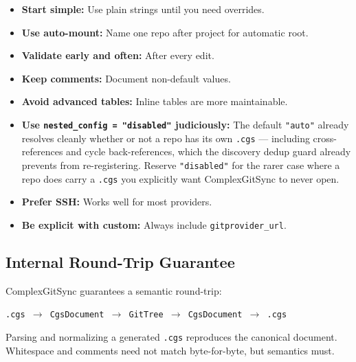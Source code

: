 \begin{itemize}
  \item \textbf{Start simple:} Use plain strings until you need overrides.
  \item \textbf{Use auto-mount:} Name one repo after project for automatic root.
  \item \textbf{Validate early and often:} After every edit.
  \item \textbf{Keep comments:} Document non-default values.
  \item \textbf{Avoid advanced tables:} Inline tables are more maintainable.
  \item \textbf{Use \texttt{nested\_config = "disabled"} judiciously:}
        The default \texttt{"auto"} already resolves cleanly whether or not
        a repo has its own \texttt{.cgs} — including cross-references and
        cycle back-references, which the discovery dedup guard already
        prevents from re-registering. Reserve \texttt{"disabled"} for the
        rarer case where a repo does carry a \texttt{.cgs} you explicitly
        want ComplexGitSync to never open.
  \item \textbf{Prefer SSH:} Works well for most providers.
  \item \textbf{Be explicit with custom:} Always include \texttt{gitprovider\_url}.
\end{itemize}

\subsection{Internal Round-Trip Guarantee}
\label{subsec:cgs-roundtrip}

ComplexGitSync guarantees a semantic round-trip:

\begin{center}
\texttt{.cgs $\rightarrow$ CgsDocument $\rightarrow$ GitTree $\rightarrow$ CgsDocument $\rightarrow$ .cgs}
\end{center}

Parsing and normalizing a generated \texttt{.cgs} reproduces the canonical document.
Whitespace and comments need not match byte-for-byte, but semantics must.
